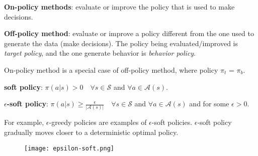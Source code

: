 \documentclass[sutton_barto_notes.tex]{subfiles}
\begin{document}
\begin{definition}
\textbf{On-policy methods}: evaluate or improve the policy that is used to make decisions.
\end{definition}
\begin{definition}
\textbf{Off-policy method}: evaluate or improve a policy different from the one used to generate the data (make decisions). The policy being evaluated/improved is \textit{target policy}, and the one generate behavior is \textit{behavior policy}.
\end{definition}

On-policy method is a special case of off-policy method, where policy $\pi_t$ = $\pi_b$.

\begin{definition}
\textbf{soft policy}: $\pi(a|s) > 0\quad \forall s \in \mathcal{S}$ and $\forall a \in \mathcal{A}(s).$
\end{definition}

\begin{definition}
\textbf{$\epsilon$-soft policy}: $\pi(a|s) \geq \frac{\epsilon}{|\mathcal{A}(s)|} \quad \forall s \in \mathcal{S}$ and $\forall a \in \mathcal{A}(s)$ and for some $\epsilon > 0$.
\end{definition}

For example, $\epsilon$-greedy policies are examples of $\epsilon$-soft policies. 
$\epsilon$-soft policy gradually moves closer to a deterministic optimal policy.

\begin{figure}[!h]
  \centering
  \texttt{[image: epsilon-soft.png]}
\end{figure}
\end{document}
